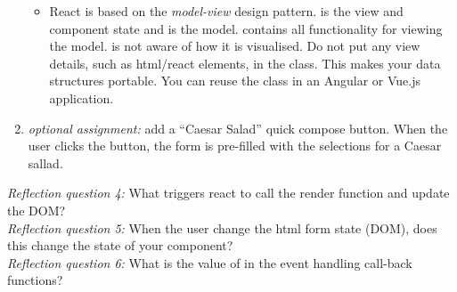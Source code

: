 \documentclass[fleqn, article, a4paper]{memoir}
\begin{document}
\begin{Assignments}
\begin{enumerate}
\begin{itemize}
  \item React is based on the \emph{model-view} design pattern.  is the view and component state and  is the model.  contains all functionality for viewing the model.  is not aware of how it is visualised. Do not put any view details, such as html/react elements, in the  class. This makes your data structures portable. You can reuse the  class in an Angular or Vue.js application.
\end{itemize}

  \item \emph{optional assignment:} add a ``Caesar Salad'' quick compose button. When the user clicks the button, the form is pre-filled with the selections for a Caesar sallad.

\end{enumerate}
\emph{Reflection question 4:} What triggers react to call the render function and update the DOM?
\\\emph{Reflection question 5:} When the user change the html form state (DOM), does this change the state of your component?
\\\emph{Reflection question 6:} What is the value of  in the event handling call-back functions?



\end{Assignments}
\end{document}
